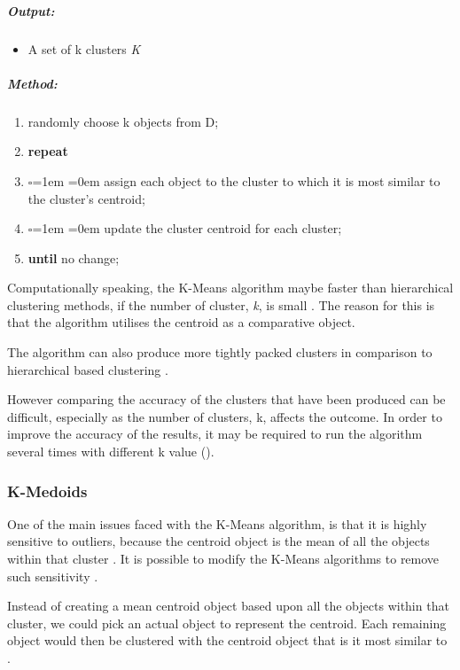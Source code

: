 \subparagraph*{Output:}
\begin{itemize}
  \item A set of k clusters {\em K}
\end{itemize}

\subparagraph*{Method:}
\begin{enumerate}
  \item randomly choose k objects from D;
  \item {\bf repeat}
  \item \begin{list}{$\square$}{\leftmargin=1em \itemindent=0em}
          assign each object to the cluster to which it is most similar to the 
          cluster’s centroid;
        \end{list}
  \item \begin{list}{$\square$}{\leftmargin=1em \itemindent=0em}
          update the cluster centroid for each cluster;
        \end{list}
  \item {\bf until} no change;
\end{enumerate}

Computationally speaking, the K-Means algorithm maybe faster than hierarchical 
clustering methods, if the number of cluster, {\emph k}, is small \citep*{ios}.
The reason for this is that the algorithm utilises the centroid as a 
comparative object. 

The algorithm can also produce more tightly packed clusters in comparison to 
hierarchical based clustering \citep{ios}.

However comparing the accuracy of the clusters that have been produced can be 
difficult, especially as the number of clusters, k, affects the outcome. In order 
to improve the accuracy of the results, it may be required to run the algorithm 
several times with different k value (\citep{ios}).

\subsubsection{K-Medoids}
One of the main issues faced with the K-Means algorithm, is that it is highly 
sensitive to outliers, because the centroid object is the mean of all the 
objects within that cluster \citep{tan05}. It is possible to modify the K-Means
algorithms to remove such sensitivity \citep{tan05}. 

Instead of creating a mean centroid object based upon all the objects within 
that cluster, we could pick an actual object to represent the centroid. Each 
remaining object would then be clustered with the centroid object that is it 
most similar to \citep{tan05}.


